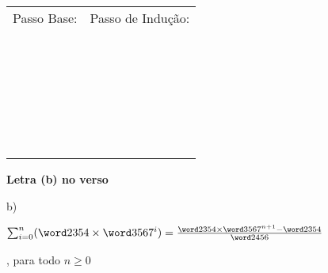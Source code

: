 \documentclass[16pt]{examdesign}
\begin{document}
\begin{fillin}[title={},
                    rearrange=no,resetcounter=no,suppressprefix]
\begin{question}
	         	    \begin{tabular}{p{9cm}|p{10cm}} 
	Passo Base: 			&Passo de Indução: \\
										& \\
					& \\
					& \\
					& \\
					& \\
					& \\
					& \\
					& \\
					& \\
					& \\
					& \\
					& \\
					& \\
					& \\
					& \\
					& \\
					& \\
					& \\
					& \\
					& \\
					& \\
					
					& \\
					& \\
					& \\
					& \\
					& \\
					& \\
	\end{tabular}
	\begin{center}
	\textbf{Letra (b) no verso}	 
	\end{center}


	\pagebreak
	b) \begin{Large}$\sum_{i=0}^{n} (\miX \times \miR^i) = \frac{\miX \times \miR^{n+1}-\miX}{\miRMenosUm}$\end{Large}, para todo \textbf{$n \ge 0$}
	

\end{question}
\end{fillin}
\end{document}
